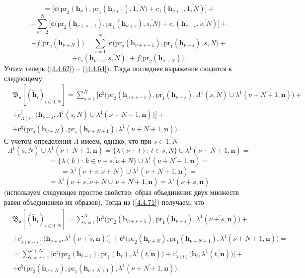 \documentclass[11pt,twoside,openany]{report}
\newcommand{\ov}{\overline}
\newcommand{\La}{\Lambda}
\newcommand{\la}{\lambda}
\begin{document}
{{$$$$
$$
=\bigl[\mathbf{c}\bigl(\mathrm{pr}_2(\mathbf{h}_\nu),\mathrm{pr}_1(\mathbf{h}_{\nu+1}),
\ov{1,N}\bigl) + c_1(\mathbf{h}_{\nu+1},\ov{1,N})\bigl] +
$$
$$
+ \sum\limits_{s=2}^N\bigl[\mathbf{c}\bigl(\mathrm{pr}_2(\mathbf{h}_{\nu+s-1}),\mathrm{pr}_1
(\mathbf{h}_{\nu+s}),\ov{s,N}\bigl) + c_s(\mathbf{h}_{\nu+s},\ov{s,N})\bigl] +
$$
$$
+f\bigl(\mathrm{pr}_2(\mathbf{h}_{\nu+N})\bigl) =
\sum\limits_{s=1}^N\bigl[\mathbf{c}\bigl(\mathrm{pr}_2(\mathbf{h}_{\nu+s-1}),\mathrm{pr}_1
(\mathbf{h}_{\nu+s}),\ov{s,N}\bigl)+
$$
$$+ c_s(\mathbf{h}_{\nu+s},\ov{s,N})\bigl] + f\bigl(\mathrm{pr}_2(\mathbf{h}_{\nu+N})\bigl).
$$
Учтем теперь (\ref{4.4.62}) -- (\ref{4.4.64}). Тогда последнее выражение сводится к следующему
\begin{eqnarray}
&\mathfrak{B}_\mathbf{e}[(\tilde{\mathbf{h}}_i)_{i\in\ov{0,N}}]=
\sum\limits_{s=1}^N \bigl[\mathbf{c}^\natural\bigl(\mathrm{pr}_2(\mathbf{h}_{\nu+s-1}),
\mathrm{pr}_1(\mathbf{h}_{\nu+s}),
\La^1(\ov{s,N})\cup \la^1(\ov{\nu+N+1,\mathbf{n}})\bigl) +
&\nonumber\\
&+ c_{\La(s)}^\natural\bigl(\mathbf{h}_{\nu+s},\La^1(\ov{s,N}) \cup \la^1(\ov{\nu+N+1,\mathbf{n}})\bigl)\bigl]+
&\nonumber\\
&+ \mathbf{c}^\natural\bigl(\mathrm{pr}_2(\mathbf{h}_{\nu+N}),\mathrm{pr}_1(\mathbf{h}_{\nu+N+1}),
\la^1(\ov{\nu+N+1,\mathbf{n}})\bigl).
&\label{4.4.71}
\end{eqnarray}
С учетом определения $\La$ имеем, однако, что при $s\in\ov{1,N}$
$$\La^1(\ov{s,N}) \cup \la^1(\ov{\nu+N+1,\mathbf{n}}) = \{\la(\nu+t):\,t\in \ov{s,N}\} \cup
\la^1(\ov{\nu+N+1,\mathbf{n}}) =
$$
$$
=\{\la(k):\,k\in\ov{\nu+s,\nu+N}\} \cup \la^1(\ov{\nu+N+1,\mathbf{n}})=
$$
$$
=\la^1(\ov{\nu+s,\nu+N}) \cup \la^1(\ov{\nu+N+1,\mathbf{n}}) =
$$
$$
= \la^1(\ov{\nu+s,\nu+N} \cup\, \ov{\nu+N+1,\mathbf{n}}) = \la^1(\ov{\nu+s,
\mathbf{n}})
$$
(используем следующее простое свойство: образ объединения двух множеств равен
объединению их образов). Тогда из (\ref{4.4.71}) получаем, что
\begin{eqnarray}
&\mathfrak{B}_\mathbf{e}[(\tilde{\mathbf{h}}_i)_{i\in\ov{0,N}}]=
\sum\limits_{s=1}^N \bigl[\mathbf{c}^\natural\bigl(\mathrm{pr}_2(\mathbf{h}_{\nu+s-1}),
\mathrm{pr}_1(\mathbf{h}_{\nu+s}),
\la^1(\ov{\nu+s,\mathbf{n}})\bigl) +
&\nonumber\\
&+c_{\la(\nu+s)}^\natural(\mathbf{h}_{\nu+s},
\la^1(\ov{\nu+s,\mathbf{n}})\bigl)\bigl] +
\mathbf{c}^\natural\bigl(\mathrm{pr}_2(\mathbf{h}_{\nu+N}),\mathrm{pr}_1(\mathbf{h}_{\nu+N+1}),
\la^1(\ov{\nu+N+1,\mathbf{n}})\bigl) =
&\nonumber\\
&=\sum\limits_{t=\nu+1}^{\nu+N}\bigl[\mathbf{c}^\natural\bigl(\mathrm{pr}_2(\mathbf{h}_{t-1}),
\mathrm{pr}_1(\mathbf{h}_t),\la^1(\ov{t,\mathbf{n}})\bigl)+
c_{\la(t)}^\natural\bigl(\mathbf{h}_t,\la^1(\ov{t,\mathbf{n}})\bigl)\bigl] +
&\nonumber\\
&+ \mathbf{c}^\natural\bigl(\mathrm{pr}_2(\mathbf{h}_{\nu+N}),\mathrm{pr}_1(\mathbf{h}_{\nu+N+1}),
\la^1(\ov{\nu+N+1,\mathbf{n}})\bigl).
&\label{4.4.72}
\end{eqnarray}

}}
\end{document}
